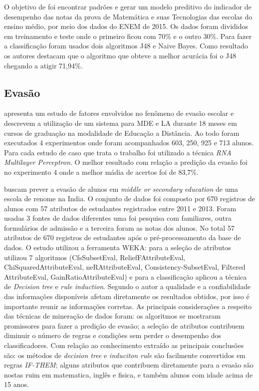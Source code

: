 \documentclass[ti]{texufpel} %
\begin{document}
O objetivo de \citet{alves2018prediccao} foi encontrar padrões e gerar um modelo preditivo do indicador de desempenho das notas da prova de Matemática e suas Tecnologias das escolas do ensino médio, por meio dos dados do ENEM de 2015. Os dados foram divididos em treinamento e teste onde o primeiro ficou com 70\% e o outro 30\%. Para fazer a classificação foram usados dois algoritmos J48 e Naive Bayes. Como resultado os autores destacam que o algoritmo que obteve a melhor acurácia foi o J48 chegando a atigir 71,94\%.

\subsection{Evasão}

\citet{rigo2014aplicaccoes} apresenta um estudo de fatores envolvidos no fenômeno de evasão escolar e descrevem a utilização de um sistema para MDE e LA durante 18 meses em cursos de graduação na modalidade de Educação a Distância. Ao todo foram executados 4 experimentos onde foram acompanhados 603, 250, 925 e 713 alunos. Para cada estudo de caso que trata o trabalho foi utilizado a técnica \textit{RNA Multilayer Perceptron}. O melhor resultado com relação a predição da evasão foi no experimento 4 onde a melhor mádia de acertos foi de 83,7\%.

\citet{pradeep2015students} buscam prever a evasão de alunos em \textit{middle or secondary education} de uma escola de renome na India. O conjunto de dados foi composto por 670 registros de alunos com 57 atributos de estudantes registrados entre 2011 e 2013. Foram usadas 3 fontes de dados diferentes uma foi pesquisa com familiares, outra formulários de admissão e a terceira foram as notas dos alunos. No total 57 atributos de 670 registros de estudantes após o pré-processamento da base de dados. O estudo utilizou a ferramenta WEKA: para a seleção de atributos utilizou 7 algoritmos (CfsSubsetEval, ReliefFAttributeEval, ChiSquaredAttributeEval, neRAttributeEval, Consistency-SubsetEval, Filtered AttributeEval, GainRatioAttributeEval) e para a classificação aplicou a técnica de \textit{Decision tree} e \textit{rule induction}. Segundo o autor a qualidade e a confiabilidade das informações disponíveis afetam diretamente os resultados obtidos, por isso é importante reunir as informações corretas. As principais considerações a respeito das técnicas de mineração de dados foram: os algoritmos se mostraram promissores para fazer a predição de evasão; a seleção de atributos contribuem diminuir o número de regras e condições sem perder o desempenho dos classificadores. Com relação ao conhecimento extraído as principais conclusões são: os métodos de \textit{decision tree} e \textit{induciton rule} são facilmente convertidos em regras \textit{IF-THEM}; alguns atributos que contribuem diretamente para a evasão são nostas ruim em matematica, inglês e fisica, e também alunos com idade acima de 15 anos.
\end{document}
